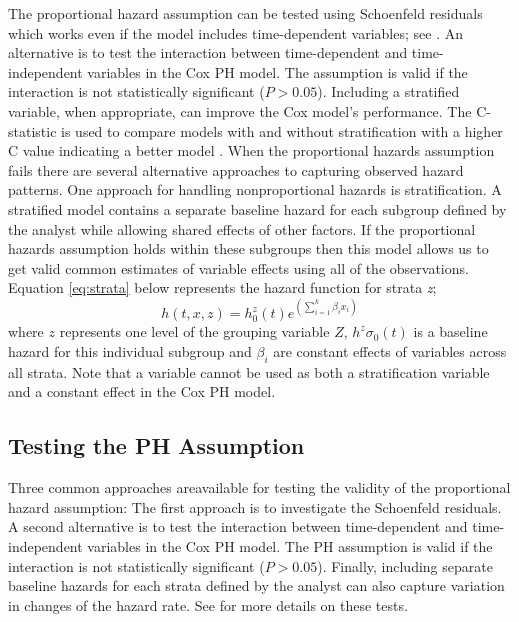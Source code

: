 \documentclass[12pt,letterpaper]{article}
\begin{document}
The proportional hazard assumption can be tested using Schoenfeld residuals which works even if the model includes time-dependent variables; see \citet{allison2010,collett2015}. An alternative is to test the interaction between time-dependent and time-independent variables in the Cox PH model. The assumption is valid if the interaction is not statistically significant ($P>0.05$).  Including a stratified variable, when appropriate, can improve the Cox model's performance.  The C-statistic is used to compare models with and without stratification with a higher C value indicating a better model \citep{lemke2012}.
When the proportional hazards assumption fails there are several alternative approaches to capturing observed hazard patterns. One approach for handling nonproportional hazards is stratification.  A stratified model contains a separate baseline hazard for each subgroup defined by the analyst while allowing shared effects of other factors. If the proportional hazards assumption holds within these subgroups then this model allows us to get valid common estimates of variable effects using all of the observations. Equation \ref{eq:strata} below represents the hazard function for strata {\it z};
\begin{equation}
\label{eq:strata}
h(t,x,z)=h^z_0(t)e^{(\sum_{i=1}^{k}\beta_ix_i)}
\end{equation}
where $z$ represents one level of the grouping variable $Z$, $h^z\sigma_0(t)$ is a baseline hazard for this individual subgroup and $\beta_i$ are constant effects of variables across all strata. Note that a variable cannot be used as both a stratification variable and a constant effect in the Cox PH model.

\subsection{Testing the PH Assumption}
Three common approaches areavailable for testing the validity of the proportional hazard assumption: The first approach is to investigate the Schoenfeld residuals. A second alternative is to test the interaction between time-dependent and time-independent variables in the Cox PH model. The PH assumption is valid if the interaction is not statistically significant ($P>0.05$). Finally, including separate baseline hazards for each strata defined by the analyst can also capture variation in changes of the hazard rate. See \citet{allison2010,collett2015} for more details on these tests.
\end{document}
